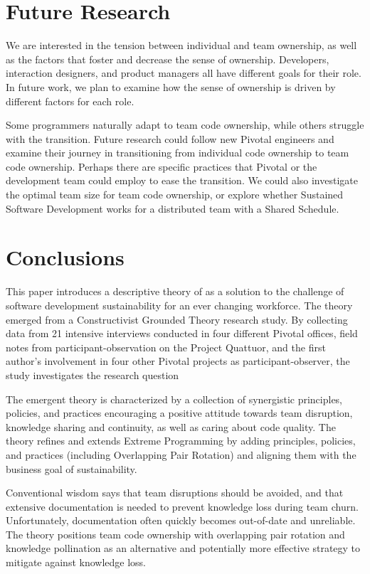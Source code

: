 \section{Future Research}
We are interested in the tension between individual and team ownership, as well as the factors that foster and decrease the sense of ownership. Developers, interaction designers, and product managers all have different goals for their role. In future work, we plan to examine how the sense of ownership is driven by different factors for each role.

Some programmers naturally adapt to team code ownership, while others struggle with the transition. Future research could follow new Pivotal engineers and examine their journey in transitioning from individual code ownership to team code ownership. Perhaps there are 
specific practices that Pivotal or the development team could employ to ease the transition. We could also investigate the optimal team size for team code ownership, or explore whether Sustained Software Development works for a distributed team with a Shared Schedule.
\section{Conclusions}
This paper introduces a descriptive theory of  as a solution to the challenge of software development sustainability for an ever changing workforce. The theory emerged from a Constructivist Grounded Theory research study. By collecting data from 21 intensive interviews conducted in four different Pivotal offices, field notes from participant-observation on the Project Quattuor, and the first author’s involvement in four other Pivotal projects as participant-observer, the study investigates the research question 

The emergent theory is characterized by a collection of synergistic principles, policies, and practices encouraging a positive attitude towards team disruption, knowledge sharing and continuity, as well as caring about code quality. The theory refines and extends Extreme Programming by adding principles, policies, and practices (including Overlapping Pair Rotation) and aligning them with the business goal of sustainability.

Conventional wisdom says that team disruptions should be avoided, and that extensive documentation is needed to prevent knowledge loss during team churn. Unfortunately, documentation often quickly becomes out-of-date and unreliable. The theory positions team code ownership with overlapping pair rotation and knowledge pollination as an alternative and potentially more effective strategy to mitigate against knowledge loss.

